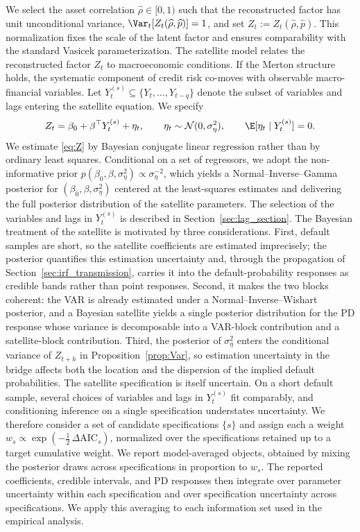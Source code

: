 We select the asset correlation $\widehat\rho \in [0,1)$ such that the
reconstructed factor has unit unconditional variance,
$\Var_t[Z_t(\widehat\rho,\widehat p)] = 1$, and set
$Z_t := Z_t(\widehat\rho,\widehat p)$. This normalization fixes the scale of the
latent factor and ensures comparability with the standard Vasicek
parameterization.
The satellite model relates the reconstructed factor $Z_t$ to macroeconomic
conditions. If the Merton structure holds, the systematic component of credit
risk co-moves with observable macro-financial variables. Let
$Y^{(s)}_t \subseteq \{Y_t,\dots,Y_{t-q}\}$ denote the subset of variables and
lags entering the satellite equation. We specify
\begin{equation}
    Z_t = \beta_0 + \beta^\top Y^{(s)}_t + \eta_t,
    \qquad
    \eta_t \sim \mathcal{N}(0,\sigma_\eta^2),
    \qquad
    \E[\eta_t \mid Y^{(s)}_t] = 0.
    \label{eq:Z}
\end{equation}
We estimate \eqref{eq:Z} by Bayesian conjugate linear regression rather than by
ordinary least squares. Conditional on a set of regressors, we adopt the
non-informative prior $p(\beta_0,\beta,\sigma_\eta^2)\propto \sigma_\eta^{-2}$,
which yields a Normal--Inverse--Gamma posterior for $(\beta_0,\beta,\sigma_\eta^2)$
centered at the least-squares estimates and delivering the full posterior
distribution of the satellite parameters. The selection of the variables and
lags in $Y^{(s)}_t$ is described in Section~\ref{sec:lag_section}.
The Bayesian treatment of the satellite is motivated by three considerations.
First, default samples are short, so the satellite coefficients are estimated
imprecisely; the posterior quantifies this estimation uncertainty and, through
the propagation of Section~\ref{sec:irf_transmission}, carries it into the
default-probability responses as credible bands rather than point responses.
Second, it makes the two blocks coherent: the VAR is already estimated under a
Normal--Inverse--Wishart posterior, and a Bayesian satellite yields a single
posterior distribution for the PD response whose variance is decomposable into a
VAR-block contribution and a satellite-block contribution. Third, the posterior
of $\sigma_\eta^2$ enters the conditional variance of $Z_{t+h}$ in
Proposition~\ref{prop:Var}, so estimation uncertainty in the bridge affects both
the location and the dispersion of the implied default probabilities.
The satellite specification is itself uncertain. On a short default sample,
several choices of variables and lags in $Y^{(s)}_t$ fit comparably, and
conditioning inference on a single specification understates uncertainty. We
therefore consider a set of candidate specifications $\{s\}$ and assign each a
weight $w_s \propto \exp(-\tfrac{1}{2}\,\Delta\mathrm{AIC}_s)$, normalized over
the specifications retained up to a target cumulative weight. We report
model-averaged objects, obtained by mixing the posterior draws across
specifications in proportion to $w_s$. The reported coefficients, credible
intervals, and PD responses then integrate over parameter uncertainty within
each specification and over specification uncertainty across specifications. We
apply this averaging to each information set used in the empirical analysis.
